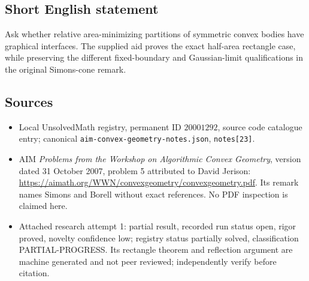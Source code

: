 \documentclass[11pt]{article}
\begin{document}
\subsection{Short English statement}
Ask whether relative area-minimizing partitions of symmetric convex bodies have graphical interfaces. The supplied aid proves the exact half-area rectangle case, while preserving the different fixed-boundary and Gaussian-limit qualifications in the original Simons-cone remark.
\subsection{Sources}
\begin{itemize}
\item Local UnsolvedMath registry, permanent ID $20001292$, source code catalogue entry; canonical \texttt{aim-convex-geometry-notes.json}, \texttt{notes[23]}.
\item AIM \emph{Problems from the Workshop on Algorithmic Convex Geometry}, version dated 31 October 2007, problem 5 attributed to David Jerison: \url{https://aimath.org/WWN/convexgeometry/convexgeometry.pdf}. Its remark names Simons and Borell without exact references. No PDF inspection is claimed here.
\item Attached research attempt 1: partial result, recorded run status open, rigor proved, novelty confidence low; registry status partially solved, classification PARTIAL-PROGRESS. Its rectangle theorem and reflection argument are machine generated and not peer reviewed; independently verify before citation.
\end{itemize}
\end{document}
